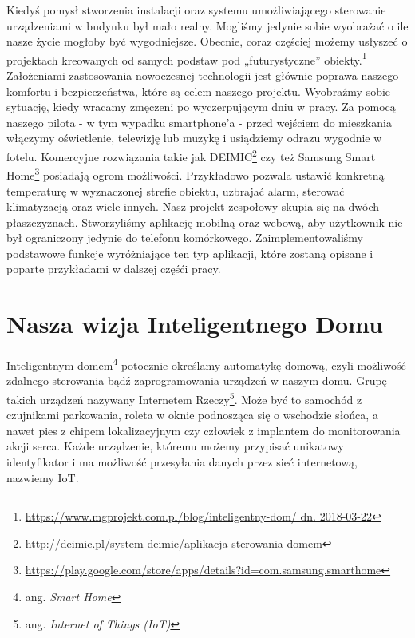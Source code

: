 \documentclass{xmgr}
\begin{document}
\introduction
Kiedyś pomysł stworzenia instalacji oraz systemu umożliwiającego sterowanie urządzeniami w budynku był mało realny. Mogliśmy jedynie sobie wyobrażać o ile nasze życie mogłoby być wygodniejsze. Obecnie, coraz częściej możemy usłyszeć o projektach kreowanych od samych podstaw pod „futurystyczne” obiekty.\footnote{\url{https://www.mgprojekt.com.pl/blog/inteligentny-dom/ dn. 2018-03-22}} Założeniami zastosowania nowoczesnej technologii jest głównie poprawa naszego komfortu i bezpieczeństwa, które są celem naszego projektu. Wyobraźmy sobie sytuację, kiedy wracamy zmęczeni po wyczerpującym dniu w pracy. Za pomocą naszego pilota - w tym wypadku smartphone'a - przed wejściem do mieszkania włączymy oświetlenie, telewizję lub muzykę i usiądziemy odrazu wygodnie w fotelu. Komercyjne rozwiązania takie jak DEIMIC\footnote{\url{http://deimic.pl/system-deimic/aplikacja-sterowania-domem}} czy też Samsung Smart Home\footnote{\url{https://play.google.com/store/apps/details?id=com.samsung.smarthome}} posiadają ogrom możliwości. Przykładowo pozwala ustawić konkretną temperaturę w wyznaczonej strefie obiektu, uzbrajać alarm, sterować klimatyzacją oraz wiele innych. Nasz projekt zespołowy skupia się na dwóch płaszczyznach. Stworzyliśmy aplikację mobilną oraz webową, aby użytkownik nie był ograniczony jedynie do telefonu komórkowego. Zaimplementowaliśmy podstawowe funkcje wyróżniające ten typ aplikacji, które zostaną opisane i poparte przykładami w dalszej częśći pracy.


\chapter{Nasza wizja Inteligentnego Domu}
Inteligentnym domem\cite{Rouse:2017:Tech}\footnote{ang. \emph{Smart Home}} potocznie określamy automatykę domową, czyli możliwość zdalnego sterowania bądź zaprogramowania urządzeń w naszym domu. Grupę takich urządzeń nazywany Internetem Rzeczy\cite{Rouse:2016:iot}\footnote{ang. \emph{Internet of Things (IoT)}}. Może być to samochód z czujnikami parkowania, roleta w oknie podnosząca się o wschodzie słońca, a nawet pies z chipem lokalizacyjnym czy człowiek z implantem do monitorowania akcji serca. Każde urządzenie, któremu możemy przypisać unikatowy identyfikator i ma możliwość przesyłania danych przez sieć internetową, nazwiemy IoT. 
\end{document}
